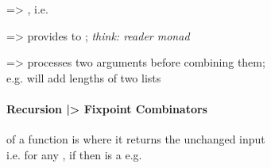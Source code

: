  => , i.e. 

 =>  provides
 to ; \textit{think: reader monad}

 =>  processes
two arguments before combining them; \\
e.g.  will add lengths of two lists

\hSep
\vspace{2pt}

\paragraph*{Recursion |> Fixpoint Combinators}

 of a function is where it returns the unchanged input \\
i.e. for any , if  then  is a 
e.g. 

